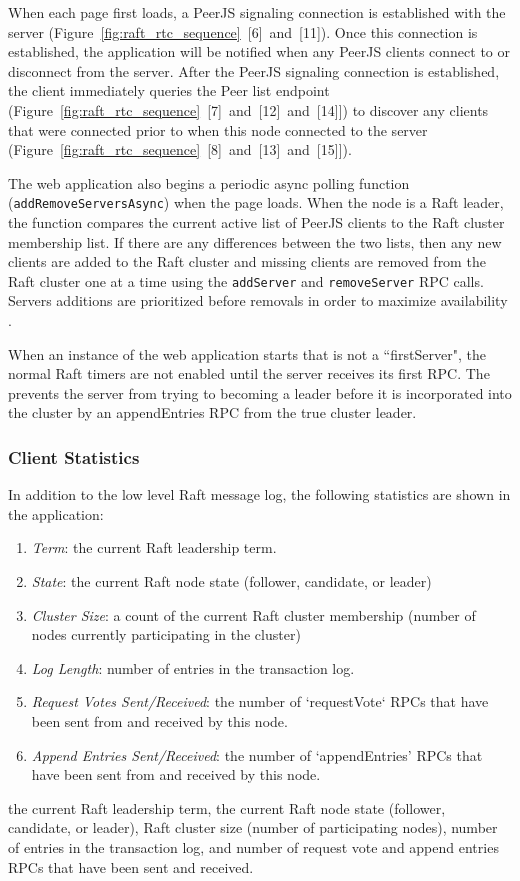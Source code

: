 \documentclass[conference,compsoc]{./IEEEtran/IEEEtran}
\begin{document}
When each page first loads, a PeerJS signaling connection is
established with the server
(Figure~\ref{fig:raft_rtc_sequence}~[6]~and~[11]). Once this
connection is established, the application will be notified when any
PeerJS clients connect to or disconnect from the server.  After the
PeerJS signaling connection is established, the client immediately
queries the Peer list endpoint
(Figure~\ref{fig:raft_rtc_sequence}~[7]~and~[12]~and~[14]]) to discover
any clients that were connected prior to when this node connected to
the server (Figure~\ref{fig:raft_rtc_sequence}~[8]~and~[13]~and~[15]]).

The web application also begins a periodic async polling function
(\texttt{addRemoveServersAsync}) when the page loads. When the node is a Raft
leader, the function compares the current active list of PeerJS clients to
the Raft cluster membership list. If there are any differences between
the two lists, then any new clients are added to the Raft cluster and
missing clients are removed from the Raft cluster one at a time using
the \texttt{addServer} and \texttt{removeServer} RPC calls. Servers
additions are prioritized before removals 
in order to maximize availability
\cite[Section~4.4]{raft_thesis:ongaro14}.

When an instance of the web application starts that is not
a ``firstServer", the normal Raft timers are not enabled until the
server receives its first RPC. The prevents the server from
trying to becoming a leader before it is incorporated into the cluster
by an appendEntries RPC from the true cluster leader.

\subsubsection{Client Statistics}

In addition to the low level Raft message log, the following
statistics are shown in the application:
\ifdefined\OPTIONAL

\begin{enumerate}
\item \emph{Term}: the current Raft leadership term.
\item \emph{State}: the current Raft node state (follower, candidate,
    or leader)
\item \emph{Cluster Size}: a count of the current Raft cluster
    membership (number of nodes currently participating in the
    cluster)
\item \emph{Log Length}: number of entries in the transaction log.
\item \emph{Request Votes Sent/Received}: the number of `requestVote`
    RPCs that have been sent from and received by this node.
\item \emph{Append Entries Sent/Received}: the number of
    `appendEntries' RPCs that have been sent from and received by this
    node.
\end{enumerate}
\else
the current Raft leadership term, the current Raft node state
(follower, candidate, or leader), Raft cluster size (number of
participating nodes), number of entries in the transaction log, and
number of request vote and append entries RPCs that have been sent and
received.
\fi
\end{document}
